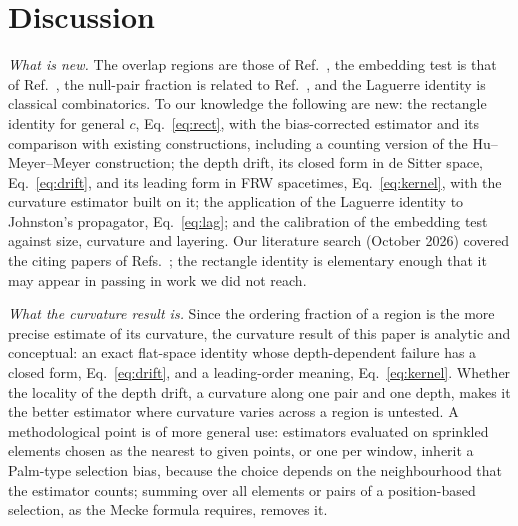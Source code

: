 \documentclass[prd,twocolumn,superscriptaddress,nofootinbib,amsmath,amssymb,floatfix]{revtex4-2}
\begin{document}
\section{Discussion}\label{sec:disc}
\emph{What is new.} The overlap regions are those of Ref.~\cite{BK24}, the embedding test is that of Ref.~\cite{CloughEvans16}, the null-pair fraction is related to Ref.~\cite{GlaserSurya13}, and the Laguerre identity is classical combinatorics. To our knowledge the following are new: the rectangle identity for general $c$, Eq.~\eqref{eq:rect}, with the bias-corrected estimator and its comparison with existing constructions, including a counting version of the Hu--Meyer--Meyer construction; the depth drift, its closed form in de Sitter space, Eq.~\eqref{eq:drift}, and its leading form in FRW spacetimes, Eq.~\eqref{eq:kernel}, with the curvature estimator built on it; the application of the Laguerre identity to Johnston's propagator, Eq.~\eqref{eq:lag}; and the calibration of the embedding test against size, curvature and layering. Our literature search (October 2026) covered the citing papers of Refs.~\cite{BK24,CloughEvans16,Johnston08,Johnston09}; the rectangle identity is elementary enough that it may appear in passing in work we did not reach.

\emph{What the curvature result is.} Since the ordering fraction of a region is the more precise estimate of its curvature, the curvature result of this paper is analytic and conceptual: an exact flat-space identity whose depth-dependent failure has a closed form, Eq.~\eqref{eq:drift}, and a leading-order meaning, Eq.~\eqref{eq:kernel}. Whether the locality of the depth drift, a curvature along one pair and one depth, makes it the better estimator where curvature varies across a region is untested. A methodological point is of more general use: estimators evaluated on sprinkled elements chosen as the nearest to given points, or one per window, inherit a Palm-type selection bias, because the choice depends on the neighbourhood that the estimator counts; summing over all elements or pairs of a position-based selection, as the Mecke formula requires, removes it.
\end{document}
